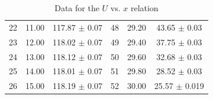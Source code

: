 \documentclass[a4paper]{article}
\begin{document}
\begin{table}[htbp]
\begin{tabular}{ccc||ccc}
		22 & 11.00                & 117.87 $\pm$ 0.07                                    & 48 & 29.20                & 43.65 $\pm$ 0.03                                     \\
		23 & 12.00                & 118.02 $\pm$ 0.07                                    & 49 & 29.40                & 37.75 $\pm$ 0.03                                     \\
		24 & 13.00                & 118.12 $\pm$ 0.07                                    & 50 & 29.60                & 32.68 $\pm$ 0.03                                     \\
		25 & 14.00                & 118.01 $\pm$ 0.07                                    & 51 & 29.80                & 28.52 $\pm$ 0.03                                     \\
		26 & 15.00                & 118.19 $\pm$ 0.07                                    & 52 & 30.00                & 25.57 $\pm$ 0.019                                    \\
		\hline
	\end{tabular}
	\caption{Data for the $U$ vs. $x$ relation}\label{TableUx}
\end{table}
\end{document}
